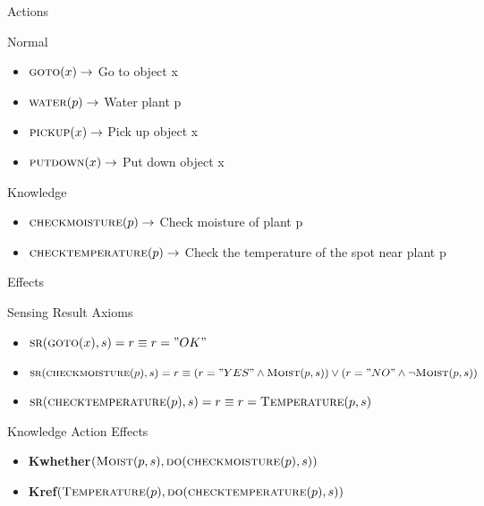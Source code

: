 \begin{frame}{Actions}
    \vspace*{-0.5cm}
    \begin{block}{Normal}
        \begin{itemize}
            \item $\textsc{goto}(x) \rightarrow$ Go to object x
            \item $\textsc{water}(p) \rightarrow$ Water plant p
            \item $\textsc{pickup}(x) \rightarrow$ Pick up object x
            \item $\textsc{putdown}(x) \rightarrow$ Put down object x
        \end{itemize}
    \end{block}
    \begin{block}{Knowledge}
        \begin{itemize}
            \item $\textsc{checkmoisture}(p) \rightarrow$ Check moisture of plant p
            \item $\textsc{checktemperature}(p) \rightarrow$ Check the temperature of the spot near plant p
        \end{itemize}
    \end{block}
\end{frame}

\begin{frame}{Effects}
    \vspace*{-0.5cm}
    \begin{block}{Sensing Result Axioms}
        \begin{itemize}
            \item $\textsc{sr}(\textsc{goto}(x),s) = r\equiv r = "OK"$
            \item $\textsc{sr}(\textsc{checkmoisture}(p),s) = r \equiv (r = "YES" \land \textsc{Moist}(p,s)) \lor (r = "NO" \land \neg \textsc{Moist}(p,s))$
            \item $\textsc{sr}(\textsc{checktemperature}(p),s) = r \equiv r = \textsc{Temperature}(p,s)$
        \end{itemize}
    \end{block}
    \begin{block}{Knowledge Action Effects}
        \begin{itemize}
            \item \textbf{Kwhether}$(\textsc{Moist}(p,s), \textsc{do}(\textsc{checkmoisture}(p),s))$
            \item \textbf{Kref}$(\textsc{Temperature}(p), \textsc{do}(\textsc{checktemperature}(p),s))$
        \end{itemize}
    \end{block}
\end{frame}

